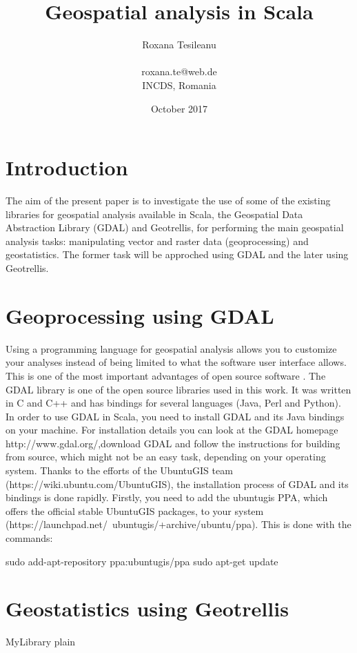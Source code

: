 \documentclass {article}
\title {Geospatial analysis in Scala}
\date {October 2017}
\author {Roxana Tesileanu \\
\\
roxana.te@web.de \\
INCDS, Romania}
\begin{document}
	\maketitle

\tableofcontents

\section {Introduction}

The aim of the present paper is to investigate the use of some of the existing libraries for geospatial analysis available in Scala, the Geospatial Data Abstraction Library (GDAL) and Geotrellis, for performing the main geospatial analysis tasks: manipulating vector and raster data (geoprocessing) and geostatistics.
The former task will be approched using GDAL and the later using Geotrellis.  

\section {Geoprocessing using GDAL}

Using a programming language for geospatial analysis allows you to customize your analyses instead of being limited to what the software user interface allows. This is one of the most important advantages of open source software \cite{garrard_geoprocessing_2016}. The GDAL library is one of the open source libraries used in this work. It was written in C and C++ and has bindings for several languages (Java, Perl and Python).     
In order to use GDAL in Scala, you need to install GDAL and its Java bindings on your machine.  
For installation details you can look at the GDAL homepage http://www.gdal.org/,download GDAL and follow the instructions for building from source, which might not be an easy task, depending on your operating system. Thanks to the efforts of the UbuntuGIS team (https://wiki.ubuntu.com/UbuntuGIS), the installation process of GDAL and its bindings is done rapidly. Firstly, you need to add the ubuntugis PPA, which offers the official stable UbuntuGIS packages, to your system (https://launchpad.net/~ubuntugis/+archive/ubuntu/ppa). This is done with the commands:

sudo add-apt-repository ppa:ubuntugis/ppa
sudo apt-get update

    


\section {Geostatistics using Geotrellis}

 {MyLibrary}
 {plain}
\end{document}
